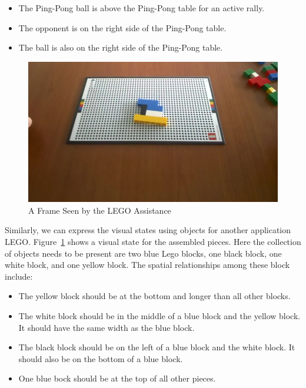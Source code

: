 \begin{itemize}
  \item The Ping-Pong ball is above the Ping-Pong table for an active rally.
  \item The opponent is on the right side of the Ping-Pong table.
  \item The ball is also on the right side of the Ping-Pong table.
\end{itemize}

\begin{figure}
  \centering
  \includegraphics[trim={0 0 0 0},width=\linewidth]{FIGS/lego}
	\caption{A Frame Seen by the LEGO Assistance}
    \label{fig:lego-image}
\end{figure}

Similarly, we can express the visual states using objects for another
application LEGO. Figure~\ref{fig:lego-image} shows a visual state for the
assembled pieces. Here the collection of objects needs to be present are two
blue Lego blocks, one black block, one white block, and one yellow block. The
spatial relationships among these block include:

\begin{itemize}
  \item The yellow block should be at the bottom and longer than all other blocks.
  \item The white block should be in the middle of a blue block and the yellow
  block. It should have the same width as the blue block.
  \item The black block should be on the left of a blue block and the white
  block. It should also be on the bottom of a blue block.
  \item One blue bock should be at the top of all other pieces.
\end{itemize}

